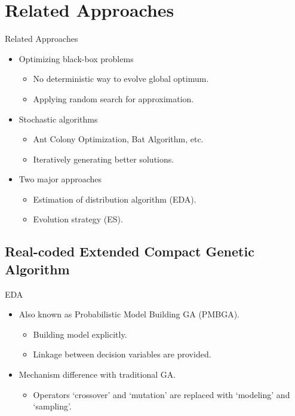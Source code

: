 \section{Related Approaches}
\begin{frame}{Related Approaches}
  \begin{itemize}
    \item Optimizing black-box problems
      \begin{itemize}
        \item No deterministic way to evolve global optimum.
        \item Applying random search for approximation.
      \end{itemize}
      \vspace*{14pt}
    \item Stochastic algorithms
      \begin{itemize}
        \item Ant Colony Optimization, Bat Algorithm, etc.
        \item Iteratively generating better solutions.
      \end{itemize}
      \vspace*{14pt}
    \item Two major approaches
      \begin{itemize}
        \item Estimation of distribution algorithm (EDA).
        \item Evolution strategy (ES).
      \end{itemize}
  \end{itemize}
\end{frame}

\subsection{Real-coded Extended Compact Genetic Algorithm}

\begin{frame}{EDA}
  \begin{itemize}
    \item Also known as Probabilistic Model Building GA (PMBGA).\pause
      \begin{itemize}
        \item Building model explicitly.
        \item Linkage between decision variables are provided.\pause
      \end{itemize}
      \vspace*{14pt}
    \item Mechanism difference with traditional GA.
      \begin{itemize}
        \item Operators `crossover' and `mutation' are replaced with
          `modeling' and `sampling'.        \pause
          \begin{figure}
            \centering
          \end{figure}
      \end{itemize}
  \end{itemize}
\end{frame}

